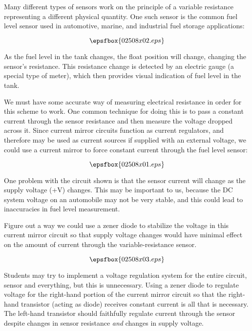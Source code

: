

Many different types of sensors work on the principle of a variable resistance representing a different physical quantity.  One such sensor is the common fuel level sensor used in automotive, marine, and industrial fuel storage applications:

$$\epsfbox{02508x02.eps}$$

As the fuel level in the tank changes, the float position will change, changing the sensor's resistance.  This resistance change is detected by an electric gauge (a special type of meter), which then provides visual indication of fuel level in the tank.

We must have some accurate way of measuring electrical resistance in order for this scheme to work.  One common technique for doing this is to pass a constant current through the sensor resistance and then measure the voltage dropped across it.  Since current mirror circuits function as current regulators, and therefore may be used as current sources if supplied with an external voltage, we could use a current mirror to force constant current through the fuel level sensor:

$$\epsfbox{02508x01.eps}$$

One problem with the circuit shown is that the sensor current will change as the supply voltage (+V) changes.  This may be important to us, because the DC system voltage on an automobile may not be very stable, and this could lead to inaccuracies in fuel level measurement.

Figure out a way we could use a zener diode to stabilize the voltage in this current mirror circuit so that supply voltage changes would have minimal effect on the amount of current through the variable-resistance sensor.







$$\epsfbox{02508x03.eps}$$







Students may try to implement a voltage regulation system for the entire circuit, sensor and everything, but this is unnecessary.  Using a zener diode to regulate voltage for the right-hand portion of the current mirror circuit so that the right-hand transistor (acting as diode) receives constant current is all that is necessary.  The left-hand transistor should faithfully regulate current through the sensor despite changes in sensor resistance {\it and} changes in supply voltage.




